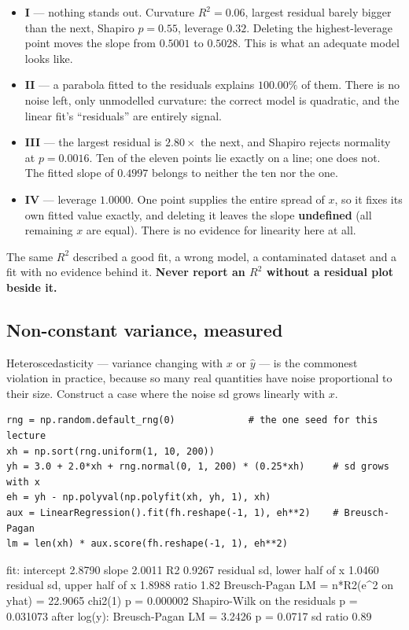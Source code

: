 \documentclass[11pt]{article}
\begin{document}
\begin{itemize}[leftmargin=*]
  \item \textbf{I} --- nothing stands out. Curvature $R^2 = 0.06$, largest
    residual barely bigger than the next, Shapiro $p = 0.55$, leverage $0.32$.
    Deleting the highest-leverage point moves the slope from $0.5001$ to
    $0.5028$. This is what an adequate model looks like.
  \item \textbf{II} --- a parabola fitted to the residuals explains
    \textbf{$100.00\%$} of them. There is no noise left, only unmodelled
    curvature: the correct model is quadratic, and the linear fit's
    ``residuals'' are entirely signal.
  \item \textbf{III} --- the largest residual is $2.80\times$ the next, and
    Shapiro rejects normality at $p = 0.0016$. Ten of the eleven points lie
    exactly on a line; one does not. The fitted slope of $0.4997$ belongs to
    neither the ten nor the one.
  \item \textbf{IV} --- leverage $\mathbf{1.0000}$. One point supplies the
    entire spread of $x$, so it fixes its own fitted value exactly, and
    deleting it leaves the slope \textbf{undefined} (all remaining $x$ are
    equal). There is no evidence for linearity here at all.
\end{itemize}

\begin{keyidea}
The same $R^2$ described a good fit, a wrong model, a contaminated dataset and
a fit with no evidence behind it. \textbf{Never report an $R^2$ without a
residual plot beside it.}
\end{keyidea}

\subsection{Non-constant variance, measured}
\label{sec:hetero}

Heteroscedasticity --- variance changing with $x$ or $\hat y$ --- is the
commonest violation in practice, because so many real quantities have noise
proportional to their size. Construct a case where the noise sd grows linearly
with $x$.

\begin{lstlisting}
rng = np.random.default_rng(0)             # the one seed for this lecture
xh = np.sort(rng.uniform(1, 10, 200))
yh = 3.0 + 2.0*xh + rng.normal(0, 1, 200) * (0.25*xh)     # sd grows with x
eh = yh - np.polyval(np.polyfit(xh, yh, 1), xh)
aux = LinearRegression().fit(fh.reshape(-1, 1), eh**2)    # Breusch-Pagan
lm = len(xh) * aux.score(fh.reshape(-1, 1), eh**2)
\end{lstlisting}
\begin{codeout}
fit: intercept 2.8790  slope 2.0011   R2 0.9267
residual sd, lower half of x  1.0460
residual sd, upper half of x  1.8988   ratio 1.82
Breusch-Pagan LM = n*R2(e^2 on yhat) = 22.9065   chi2(1) p = 0.000002
Shapiro-Wilk on the residuals p = 0.031073
after log(y): Breusch-Pagan LM = 3.2426   p = 0.0717   sd ratio 0.89
\end{codeout}
\end{document}
